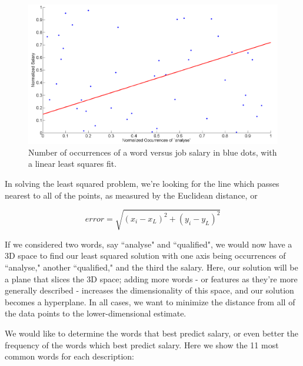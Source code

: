\documentclass[12pt]{article}
\begin{document}
    \begin{figure}
        \begin{center}
        
            \includegraphics[width=\linewidth]{figLSE}

            \caption{\label{fig:lse} Number of occurrences of a word versus job
            salary in blue dots, with a linear least squares fit.}

        \end{center}
    \end{figure}
    
    In solving the least squared problem, we're looking for the line which
    passes nearest to all of the points, as measured by the Euclidean distance,
    or

    \begin{equation}
    error = \sqrt{ (x_i - x_L)^2 + (y_i - y_L)^2} 
    \end{equation}
 
    If we considered two words, say ``analyse" and ``qualified", we would now
    have a 3D space to find our least squared solution with one axis being
    occurrences of ``analyse," another ``qualified," and the third the salary.
    Here, our solution will be a plane that slices the 3D space; adding more
    words - or features as they're more generally described - increases the
    dimensionality of this space, and our solution becomes a hyperplane.  In
    all cases, we want to minimize the distance from all of the data points to
    the lower-dimensional estimate.
    
    We would like to determine the words that best predict salary, or even
    better the frequency of the words which best predict salary. Here we show
    the 11 most common words for each description:
\end{document}
